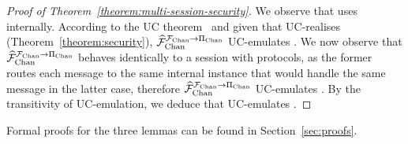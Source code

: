 \begin{proof}[Proof of Theorem~\ref{theorem:multi-session-security}]
  We observe that \fchanhat uses \fchan internally. According to the UC
  theorem~\cite{uc} and given that \pchan UC-realises \fchan
  (Theorem~\ref{theorem:security}), $\widehat{\mathcal{F}}_{\mathrm{Chan}}^{\mathcal{F}_{\mathrm{Chan}} \rightarrow \Pi_{\mathrm{Chan}}}$
  UC-emulates \fchanhat. We now observe that $\widehat{\mathcal{F}}_{\mathrm{Chan}}^{\mathcal{F}_{\mathrm{Chan}} \rightarrow
  \Pi_{\mathrm{Chan}}}$ behaves identically to a session with \pchanhat protocols, as the
  former routes each message to the same internal \pchan instance that would
  handle the same message in the latter case, therefore $\widehat{\mathcal{F}}_{\mathrm{Chan}}^{\mathcal{F}_{\mathrm{Chan}}
  \rightarrow \Pi_{\mathrm{Chan}}}$ UC-emulates \pchanhat. By the transitivity of
  UC-emulation, we deduce that \fchanhat UC-emulates \pchanhat.
\end{proof}

  Formal proofs for the three lemmas can be found in Section~\ref{sec:proofs}.
